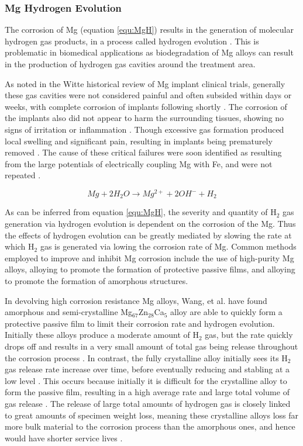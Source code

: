 \documentclass[a4paper,12pt,oneside]{report}%
\begin{document}
\subsubsection{Mg Hydrogen Evolution}
The corrosion of Mg (equation \ref{equ:MgH}) results in the generation of molecular hydrogen gas products, in a process called hydrogen evolution \cite{Zberg2009}. This is problematic in biomedical applications as biodegradation of Mg alloys can result in the production of hydrogen gas cavities around the treatment area. 

As noted in the Witte \cite{Witte2010} historical review of Mg implant clinical trials, generally these gas cavities were not considered painful and often subsided within days or weeks, with complete corrosion of implants following shortly \cite{Verbrugge1933, Lambotte1932}. The corrosion of the implants also did not appear to harm the surrounding tissues, showing no signs of irritation or inflammation \cite{Verbrugge1933}. Though excessive gas formation produced local swelling and significant pain, resulting in implants being prematurely removed \cite{Lambotte1932}. The cause of these critical failures were soon identified as resulting from the large potentials of electrically coupling Mg with Fe, and were not repeated \cite{Lambotte1932}. 

\begin{equation}
Mg + 2H_{2}O \rightarrow Mg^{2+} + 2OH^{-} + H_{2}
\label{equ:MgH}
\end{equation}

As can be inferred from equation \ref{equ:MgH}, the severity and quantity of H$_{2}$ gas generation via hydrogen evolution is dependent on the corrosion of the Mg. Thus the effects of hydrogen evolution can be greatly mediated by slowing the rate at which H$_{2}$ gas is generated via lowing the corrosion rate of Mg. Common methods employed to improve and inhibit Mg corrosion include the use of high-purity Mg alloys, alloying to promote the formation of protective passive films, and alloying to promote the formation of amorphous structures. 

In devolving high corrosion resistance Mg alloys, Wang, et al. \cite{Wang2012} have found amorphous and semi-crystalline Mg$_{67}$Zn$_{28}$Ca$_{5}$  alloy are able to quickly form a protective passive film to limit their corrosion rate and hydrogen evolution. Initially these alloys produce a moderate amount of H$_{2}$ gas, but the rate quickly drops off and results in a very small amount of total gas being release throughout the corrosion process \cite{Wang2012}. In contrast, the fully crystalline alloy initially sees its H$_{2}$ gas release rate increase over time, before eventually reducing and stabling at a low level \cite{Wang2012}. This occurs because initially it is difficult for the crystalline alloy to form the passive film, resulting in a high average rate and large total volume of gas release \cite{Wang2012}. The release of large total amounts of hydrogen gas is closely linked to great amounts of specimen weight loss, meaning these crystalline alloys loss far more bulk material to the corrosion process than the amorphous ones, and hence would have shorter service lives \cite{Wang2012}. 
\end{document}
